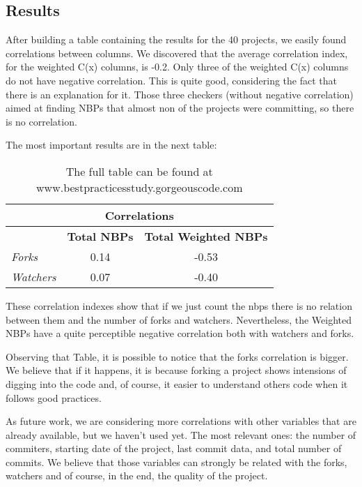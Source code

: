 \subsection{Results}\label{subsec:results}
After building a table containing the results for the 40 projects, we easily found correlations between columns.
We discovered that the average correlation index, for the weighted C(x) columns, is -0.2. Only three of the weighted C(x) columns do not have negative correlation. This is quite good, considering the fact that there is an explanation for it. 
Those three checkers (without negative correlation) aimed at finding  NBPs that almost non of the projects were committing, 
so there is no correlation.


The most important results are in the next table:
\begin{table}[H]
\begin{center}
{\scriptsize
\begin{threeparttable}
\begin{tabular}{|l||c|c|} \hline
\multicolumn{3}{|c|}{Correlations} \\ \hline
                       & \textbf{Total NBPs}  & \textbf{Total Weighted NBPs}  \\ \hline\hline
\emph{Forks         }  & 0.14                 & -0.53                       \\ \hline
\emph{Watchers      }  & 0.07                 & -0.40                       \\ \hline
\end{tabular}
\end{threeparttable}
}
\end{center}
\caption{ The full table can be found at www.bestpracticesstudy.gorgeouscode.com}
\label{table:OSPHWebSites}
\end{table}

These correlation indexes show that if we just count the nbps there is no relation between them and the number of forks and watchers. Nevertheless, the Weighted NBPs have a quite perceptible negative correlation both with watchers and forks. 

Observing that Table, it is possible to notice that the forks correlation is bigger. 
We believe that if it happens, it is because forking a project shows intensions of digging into the code and, 
of course, it easier to understand others code when it follows good practices.

As future work, we are considering more correlations with other variables that are already available, but we haven't used yet. The most relevant ones: the number of commiters, starting date of the project, last commit data, and total number of commits. We believe that those variables can strongly be related with the forks, watchers and of course, in the end, the quality of the project.

